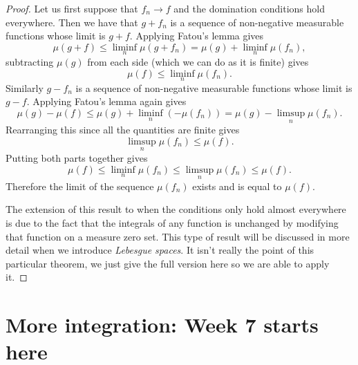 \documentclass[11pt]{article}
\theoremstyle{definition}
\theoremstyle{remark}
\begin{document}
\begin{proof}
Let us first suppose that $f_n \rightarrow f$ and the domination conditions hold everywhere. Then we have that $g+f_n$ is a sequence of non-negative measurable functions whose limit is $g+f$. Applying Fatou's lemma gives
\[ \mu(g+f) \leq \liminf_n \mu(g+f_n) = \mu(g) + \liminf_n \mu(f_n), \] subtracting $\mu(g)$ from each side (which we can do as it is finite) gives
\[ \mu(f) \leq \liminf_n \mu(f_n). \] Similarly $g-f_n$ is a sequence of non-negative measurable functions whose limit is $g-f$. Applying Fatou's lemma again gives
\[ \mu(g) - \mu(f) \leq \mu(g) + \liminf_n (-\mu(f_n)) = \mu(g) - \limsup_n \mu(f_n). \] Rearranging this since all the quantities are finite gives
\[ \limsup_n \mu(f_n) \leq \mu(f). \] Putting both parts together gives
\[ \mu(f) \leq \liminf_n \mu(f_n) \leq \limsup_n \mu(f_n) \leq \mu(f). \] Therefore the limit of the sequence $\mu(f_n)$ exists and is equal to $\mu(f)$.

The extension of this result to when the conditions only hold almost everywhere is due to the fact that the integrals of any function is unchanged by modifying that function on a measure zero set. This type of result will be discussed in more detail when we introduce \emph{Lebesgue spaces}. It isn't really the point of this particular theorem, we just give the full version here so we are able to apply it. 
\end{proof}

\section{More integration: Week 7 starts here}
\end{document}
